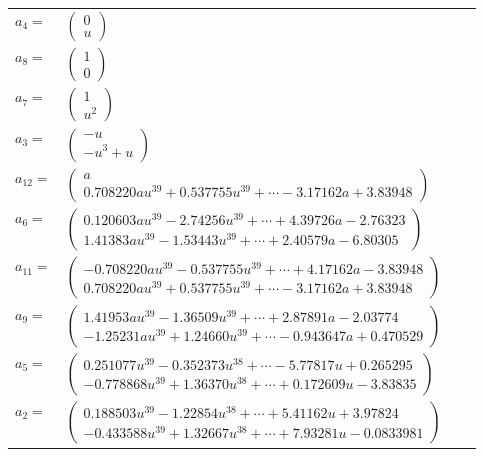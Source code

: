 \documentclass[1p]{elsarticle_modified}
\theoremstyle{definition}
\begin{document}
\begin{tabular}{m{7pt} m{180pt} m{7pt} m{180pt} }
\flushright $a_{4}=$&$\begin{pmatrix}0\\u\end{pmatrix}$ \\
\flushright $a_{8}=$&$\begin{pmatrix}1\\0\end{pmatrix}$ \\
\flushright $a_{7}=$&$\begin{pmatrix}1\\u^2\end{pmatrix}$ \\
\flushright $a_{3}=$&$\begin{pmatrix}- u\\- u^3+u\end{pmatrix}$ \\
\flushright $a_{12}=$&$\begin{pmatrix}a\\0.708220 a u^{39}+0.537755 u^{39}+\cdots-3.17162 a+3.83948\end{pmatrix}$ \\
\flushright $a_{6}=$&$\begin{pmatrix}0.120603 a u^{39}-2.74256 u^{39}+\cdots+4.39726 a-2.76323\\1.41383 a u^{39}-1.53443 u^{39}+\cdots+2.40579 a-6.80305\end{pmatrix}$ \\
\flushright $a_{11}=$&$\begin{pmatrix}-0.708220 a u^{39}-0.537755 u^{39}+\cdots+4.17162 a-3.83948\\0.708220 a u^{39}+0.537755 u^{39}+\cdots-3.17162 a+3.83948\end{pmatrix}$ \\
\flushright $a_{9}=$&$\begin{pmatrix}1.41953 a u^{39}-1.36509 u^{39}+\cdots+2.87891 a-2.03774\\-1.25231 a u^{39}+1.24660 u^{39}+\cdots-0.943647 a+0.470529\end{pmatrix}$ \\
\flushright $a_{5}=$&$\begin{pmatrix}0.251077 u^{39}-0.352373 u^{38}+\cdots-5.77817 u+0.265295\\-0.778868 u^{39}+1.36370 u^{38}+\cdots+0.172609 u-3.83835\end{pmatrix}$ \\
\flushright $a_{2}=$&$\begin{pmatrix}0.188503 u^{39}-1.22854 u^{38}+\cdots+5.41162 u+3.97824\\-0.433588 u^{39}+1.32667 u^{38}+\cdots+7.93281 u-0.0833981\end{pmatrix}$ \\

\end{tabular}
\end{document}
